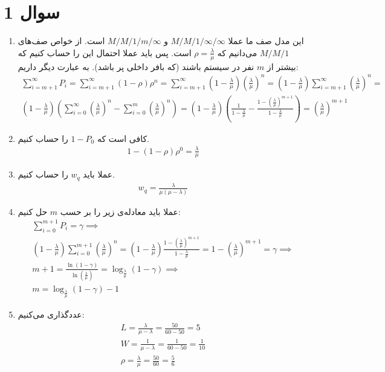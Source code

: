 \section*{سوال 1}
\begin{enumerate}
    \item این مدل صف ما عملا
    $M/M/1/\infty/\infty$
    و
    $M/M/1/m/\infty$
    است. از خواص صف‌های
    $M/M/1$
    می‌دانیم که
    $\rho = \frac{\lambda}{\mu}$
    است. پس باید عملا احتمال این را حساب کنیم که بیشتر از
    $m$
    نفر در سیستم باشند (که بافر داخلی پر باشد). به عبارت دیگر داریم:
    \begin{gather*}
        \sum_{i=m+1}^{\infty} P_i = \sum_{i=m+1}^{\infty} (1 - \rho) \rho^n = \sum_{i=m+1}^{\infty} (1 - \frac{\lambda}{\mu}) (\frac{\lambda}{\mu})^n = (1 - \frac{\lambda}{\mu}) \sum_{i=m+1}^{\infty} (\frac{\lambda}{\mu})^n =\\
        (1 - \frac{\lambda}{\mu}) (\sum_{i=0}^{\infty} (\frac{\lambda}{\mu})^n - \sum_{i=0}^{m} (\frac{\lambda}{\mu})^n) = (1 - \frac{\lambda}{\mu}) (\frac{1}{1 - \frac{\lambda}{\mu}} - \frac{1 - (\frac{\lambda}{\mu})^{m+1}}{1 - \frac{\lambda}{\mu}}) = (\frac{\lambda}{\mu})^{m+1}
    \end{gather*}
    \item کافی است که $1 - P_0$ را حساب کنیم.
    \begin{gather*}
        1 - (1 - \rho) \rho^0 = \frac{\lambda}{\mu}
    \end{gather*}
    \item عملا باید $w_q$ را حساب کنیم.
    \begin{gather*}
        w_q = \frac{\lambda}{\mu(\mu - \lambda)}
    \end{gather*}
    \item عملا باید معادله‌ی زیر را بر حسب
    $m$
    حل کنیم:
    \begin{gather*}
        \sum_{i=0}^{m+1} P_i = \gamma \implies\\
        (1 - \frac{\lambda}{\mu}) \sum_{i=0}^{m+1} (\frac{\lambda}{\mu})^n = (1 - \frac{\lambda}{\mu}) \frac{1 - (\frac{\lambda}{\mu})^{m+1}}{1 - \frac{\lambda}{\mu}} = 1 - (\frac{\lambda}{\mu})^{m+1} = \gamma \implies\\
        m + 1 = \frac{\ln (1 - \gamma)}{\ln (\frac{\lambda}{\mu})} = \log_{\frac{\lambda}{\mu}} (1 - \gamma) \implies\\
        m = \log_{\frac{\lambda}{\mu}} (1 - \gamma) - 1
    \end{gather*}
    \item عددگذاری می‌کنیم:
    \begin{gather*}
        L = \frac{\lambda}{\mu - \lambda} = \frac{50}{60 - 50} = 5\\
        W = \frac{1}{\mu - \lambda} = \frac{1}{60 - 50} = \frac{1}{10}\\
        \rho = \frac{\lambda}{\mu} = \frac{50}{60} = \frac{5}{6}
    \end{gather*}
\end{enumerate}



